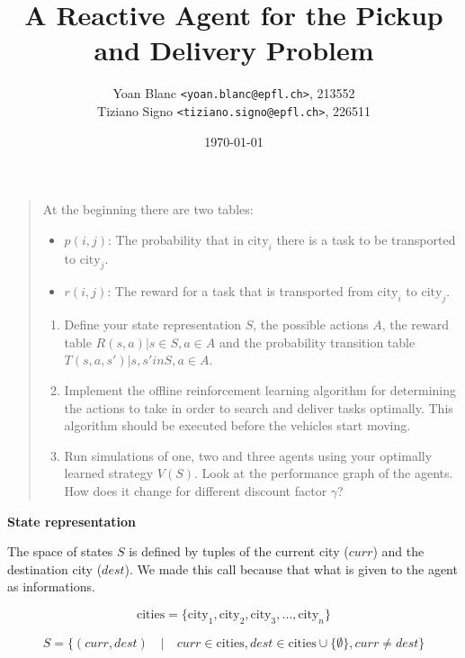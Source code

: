 \documentclass[11pt,a4paper]{article}
\title{\phantomsection%
    A Reactive Agent for the Pickup and Delivery Problem
}
\author{
    Yoan Blanc \texttt{<yoan.blanc@epfl.ch>}, 213552\\
    Tiziano Signo \texttt{<tiziano.signo@epfl.ch>}, 226511
}
\date{\today}
\begin{document}
\maketitle

\noindent
\begin{quote}{\it

    At the beginning there are two tables:

    \begin{itemize}
        \item $p(i,j)$: The probability that in $\text{city}_i$ there is a task to be transported to $\text{city}_j$.
        \item $r(i,j)$: The reward for a task that is transported from $\text{city}_i$ to $\text{city}_j$.
    \end{itemize}

    \begin{enumerate}
        \item Define your state representation $S$, the possible actions $A$, the
            reward table $R(s,a) | s \in S, a \in A$ and the probability transition
            table $T(s,a,s') | s, s' in S, a \in A$.

        \item Implement the offline reinforcement learning algorithm for
            determining the actions to take in order to search and deliver
            tasks optimally. This algorithm should be executed before the
            vehicles start moving.

        \item Run simulations of one, two and three agents using your optimally
            learned strategy $V(S)$. Look at the performance graph of the agents.
            How does it change for different discount factor $\gamma$?

    \end{enumerate}
}\end{quote}

\newpage
\medskip
\textbf{State representation}

The space of states $S$ is defined by tuples of the current city ($curr$)
and the destination city ($dest$). We made this call because that what
is given to the agent as informations.

$$ \text{cities} = \{ \text{city}_1, \text{city}_2, \text{city}_3, \ldots, \text{city}_n \}$$

$$ S = \{ (curr, dest) \quad | \quad curr \in \text{cities}, dest \in \text{cities} \cup \{ \emptyset \}, curr \neq dest \} $$
\end{document}
